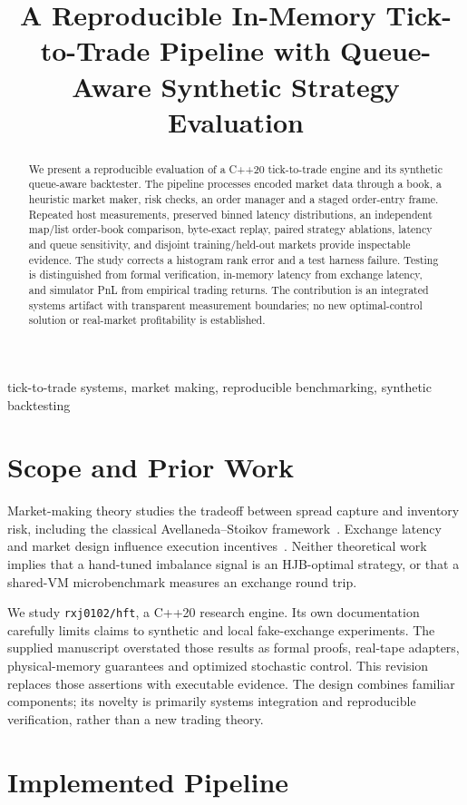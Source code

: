 \documentclass[conference]{IEEEtran}
\title{A Reproducible In-Memory Tick-to-Trade Pipeline with Queue-Aware Synthetic Strategy Evaluation}
\author{\IEEEauthorblockN{Author information pending}\IEEEauthorblockA{Research draft; affiliation and venue metadata pending}}
\begin{document}
\maketitle
\begin{abstract}
We present a reproducible evaluation of a C++20 tick-to-trade engine and its synthetic queue-aware backtester. The pipeline processes encoded market data through a book, a heuristic market maker, risk checks, an order manager and a staged order-entry frame. Repeated host measurements, preserved binned latency distributions, an independent map/list order-book comparison, byte-exact replay, paired strategy ablations, latency and queue sensitivity, and disjoint training/held-out markets provide inspectable evidence. The study corrects a histogram rank error and a test harness failure. Testing is distinguished from formal verification, in-memory latency from exchange latency, and simulator PnL from empirical trading returns. The contribution is an integrated systems artifact with transparent measurement boundaries; no new optimal-control solution or real-market profitability is established.
\end{abstract}
\begin{IEEEkeywords}tick-to-trade systems, market making, reproducible benchmarking, synthetic backtesting\end{IEEEkeywords}
\section{Scope and Prior Work}
Market-making theory studies the tradeoff between spread capture and inventory risk, including the classical Avellaneda--Stoikov framework~\cite{avellaneda2008}. Exchange latency and market design influence execution incentives~\cite{budish2015}. Neither theoretical work implies that a hand-tuned imbalance signal is an HJB-optimal strategy, or that a shared-VM microbenchmark measures an exchange round trip.

We study \texttt{rxj0102/hft}, a C++20 research engine. Its own documentation carefully limits claims to synthetic and local fake-exchange experiments. The supplied manuscript overstated those results as formal proofs, real-tape adapters, physical-memory guarantees and optimized stochastic control. This revision replaces those assertions with executable evidence. The design combines familiar components; its novelty is primarily systems integration and reproducible verification, rather than a new trading theory.

\section{Implemented Pipeline}
\end{document}
